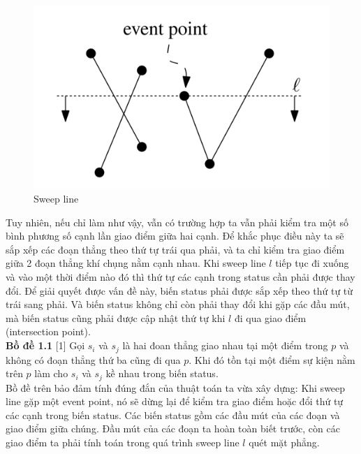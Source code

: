 \documentclass[15pt]{article}
\begin{document}
\begin{figure}[h!]
\centering
\includegraphics[scale=0.25]{./sweep_line.png}
\caption{Sweep line}
\label{fig:sweep_line}
\end{figure}

Tuy nhiên, nếu chỉ làm như vậy, vẫn có trường hợp ta vẫn phải kiểm tra một số bình phương số cạnh lần giao điểm giữa hai cạnh. Để khắc phục điều này ta sẽ sắp xếp các đoạn thẳng theo thứ tự trái qua phải, và ta chỉ kiểm tra giao điểm giữa 2 đoạn thẳng khí chụng nằm cạnh nhau. Khi sweep line $l$ tiếp tục đi xuống và vào một thời điểm nào đó thì thứ tự các cạnh trong status cần phải được thay đổi. Để giải quyết được vấn đề này, biến status phải được sắp xếp theo thứ tự từ trái sang phải. Và biến status không chỉ còn phải thay đổi khi gặp các đầu mút, mà biến status cũng phải được cập nhật thứ tự khi $l$ đi qua giao điểm (intersection point). \\

\textbf{Bồ đề 1.1} [1] Gọi $s_i$ và $s_j$ là hai đoan thẳng giao nhau tại một điểm trong $p$ và không có đoạn thẳng thứ ba cũng đi qua $p$. Khi đó tồn tại một điểm sự kiện nằm trên $p$ làm cho $s_i$ và $s_j$ kề nhau trong biến status.\\

Bồ đề trên bảo đảm tính đúng đắn của thuật toán ta vừa xây dựng: Khi sweep line gặp một event point, nó sẽ dừng lại để kiểm tra giao điểm hoặc đổi thứ tự các cạnh trong biến status. Các biến status gồm các đầu mút của các đoạn và giao điểm giữa chúng. Đầu mút của các đoạn ta hoàn toàn biết trước, còn các giao điểm ta phải tính toán trong quá trình sweep line $l$ quét mặt phẳng. \\
\end{document}
